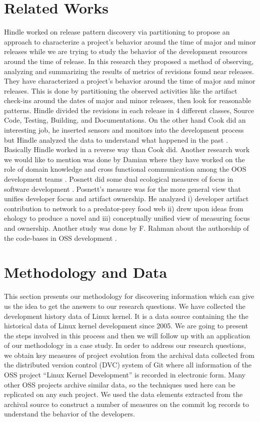 \documentclass{acm_proc_article-sp}
\begin{document}
\section{Related Works}
Hindle worked on release pattern discovery via partitioning \cite{hindle_release_pattern} to propose an approach to characterize a project's behavior around the time of major and minor releases while we are trying to study the behavior of the development resources around the time of release. In this research they proposed a method of observing, analyzing and summarizing the results of metrics of revisions found near releases. They have characterized a project's behavior around the time of major and minor releases. This is done by partitioning the observed activities like the artifact check-ins around the dates of major and minor releases, then look for reasonable patterns. Hindle divided the revisions in each release in 4 different classes, Source Code, Testing, Building, and Documentations. On the other hand Cook did an interesting job, he inserted sensors and monitors into the development process but Hindle analyzed the data to understand what happened in the past \cite{cook_automating}. Basically Hindle worked in a reverse way than Cook did. Another research work we would like to mention was done by  Damian where they have worked on the role of domain knowledge and cross functional communication among the OOS development teams \cite{damian_domain}. Posnett did some dual ecological measures of focus in software development \cite{posnett_ecological}. Posnett's measure was for the more general view that unifies developer focus and artifact ownership. He analyzed i) developer artifact contribution to network to a predator-prey food web ii) drew upon ideas from ehology to produce a novel and iii) conceptually unified view of measuring focus and ownership. Another study was done by F. Rahman about the authorship of the code-bases in OSS development \cite{rahman_ownership}.

\section{Methodology and Data}
This section presents our methodology for discovering information which can give us the idea to get the answers to our research questions. We have collected the development history data of Linux kernel. It is a data source containing the the historical data of Linux kernel development since 2005. We are going to present the steps involved in this process and then we will follow up with an application of our methodology in a case study. In order to address our research questions, we obtain key measures of project evolution from the archival data collected from the distributed version control (DVC) system of Git where all information of the OSS project ``Linux Kernel Development'' is recorded in electronic form. Many other OSS projects archive similar data, so the techniques used here can be replicated on any such project. We used the data elements extracted from the archival source to construct a number of measures on the commit log records to understand the behavior of the developers.
\end{document}
